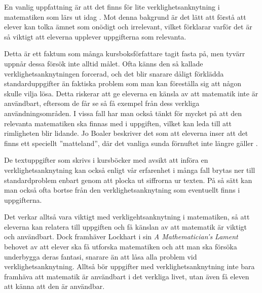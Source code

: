 \textcolor{lila}{En vanlig uppfattning är att det finns för lite verklighetsanknytning i matematiken som lärs ut idag \cite{TheElephant}. Mot denna bakgrund är det lätt att förstå att elever kan tolka ämnet som onödigt och irrelevant, vilket förklarar varför det är så viktigt att eleverna upplever uppgifterna som relevanta.}

\textcolor{lila}{Detta är ett faktum som många kursboksförfattare \todo{!} tagit fasta på, men tyvärr uppnår dessa försök inte alltid målet. Ofta känns den så kallade verklighetsanknytningen forcerad, och det blir snarare dåligt förklädda standarduppgifter än faktiska problem som man kan föreställa sig att någon skulle vilja lösa. Detta riskerar att ge eleverna en känsla av att matematik inte är användbart, eftersom de får se så få exempel från dess verkliga användningsområden.
I vissa fall har man också tänkt för mycket på att den relevanta matematiken ska finnas med i uppgiften, vilket kan leda till att rimligheten blir lidande. Jo Boaler beskriver det som att eleverna inser att det finns ett speciellt ''matteland'', där det vanliga sunda förnuftet inte längre gäller \cite{TheElephant}.}
    
\textcolor{lila}{De textuppgifter som skrivs  i kursböcker med avsikt att införa en verklighetsanknytning kan också enligt vår erfarenhet i många fall brytas ner till standardproblem enbart genom att plocka ut siffrorna ur texten. På så sätt kan man också ofta bortse från den verklighetsanknytning som eventuellt finns i uppgifterna.}

\textcolor{lila}{Det verkar alltså vara viktigt med verkligehtsanknytning i matematiken, så att eleverna kan relatera till uppgiften och få känslan av att matematik är viktigt och användbart.} \textcolor{Mahogany}{Dock framhäver Lockhart i sin \textsl{A Mathematician's Lament} \cite{lockhart} behovet av att elever ska få utforska matematiken och att man ska försöka underbygga deras fantasi, snarare än att låsa alla problem vid verklighetsanknytning. Alltså bör uppgifter med verklighetsanknytning inte bara framhäva att matematik är användbart i det verkliga livet, utan även få eleven att känna att den är användbar.}